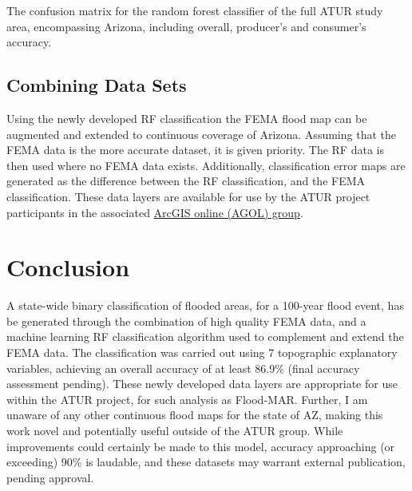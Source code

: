 \documentclass[
]{agujournal2019}
\begin{document}
\begin{table}

\caption{\label{tbl-confusion3}The confusion matrix for the random
forest classifier of the full ATUR study area, encompassing Arizona,
including overall, producer's and consumer's accuracy.}


\end{table}%

\subsection{Combining Data Sets}\label{combining-data-sets}

Using the newly developed RF classification the FEMA flood map can be
augmented and extended to continuous coverage of Arizona. Assuming that
the FEMA data is the more accurate dataset, it is given priority. The RF
data is then used where no FEMA data exists. Additionally,
classification error maps are generated as the difference between the RF
classification, and the FEMA classification. These data layers are
available for use by the ATUR project participants in the associated
\href{https://uagis.maps.arcgis.com/home/group.html?id=f76541c22acb40e8948d9d246b8611c5\#overview}{ArcGIS
online (AGOL) group}.

\section{Conclusion}\label{conclusion}

A state-wide binary classification of flooded areas, for a 100-year
flood event, has be generated through the combination of high quality
FEMA data, and a machine learning RF classification algorithm used to
complement and extend the FEMA data. The classification was carried out
using 7 topographic explanatory variables, achieving an overall accuracy
of at least 86.9\% (final accuracy assessment pending). These newly
developed data layers are appropriate for use within the ATUR project,
for such analysis as Flood-MAR. Further, I am unaware of any other
continuous flood maps for the state of AZ, making this work novel and
potentially useful outside of the ATUR group. While improvements could
certainly be made to this model, accuracy approaching (or exceeding)
90\% is laudable, and these datasets may warrant external publication,
pending approval.
\end{document}
